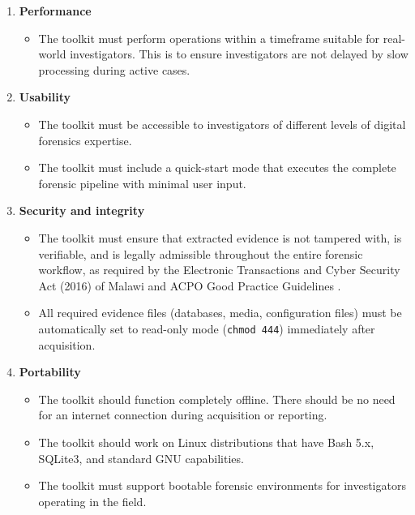 \documentclass[12pt,a4paper]{report}
\begin{document}
\begin{enumerate}
    \item \textbf{Performance}
    \begin{itemize}
        \item The toolkit must perform operations within a timeframe suitable for real-world investigators. This is to ensure investigators are not delayed by slow processing during active cases.
    \end{itemize}

    \item \textbf{Usability}
    \begin{itemize}
        \item The toolkit must be accessible to investigators of different levels of digital forensics expertise.
        \item The toolkit must include a quick-start mode that executes the complete forensic pipeline with minimal user input.
    \end{itemize}

    \item \textbf{Security and integrity}
    \begin{itemize}
        \item The toolkit must ensure that extracted evidence is not tampered with, is verifiable, and is legally admissible throughout the entire forensic workflow, as required by the Electronic Transactions and Cyber Security Act (2016) of Malawi and ACPO Good Practice Guidelines \citep{guttman2022}.
        \item All required evidence files (databases, media, configuration files) must be automatically set to read-only mode (\texttt{chmod 444}) immediately after acquisition.
    \end{itemize}

    \item \textbf{Portability}
    \begin{itemize}
        \item The toolkit should function completely offline. There should be no need for an internet connection during acquisition or reporting.
        \item The toolkit should work on Linux distributions that have Bash 5.x, SQLite3, and standard GNU capabilities.
        \item The toolkit must support bootable forensic environments for investigators operating in the field.
    \end{itemize}


\end{enumerate}
\end{document}
